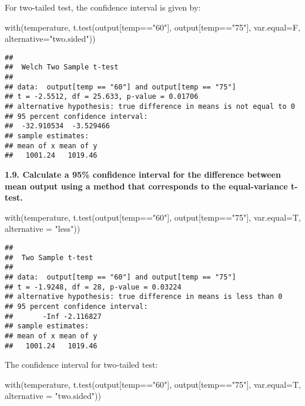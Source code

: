 \documentclass[
]{article}
\newenvironment{Shaded}{\begin{snugshade}}{\end{snugshade}}
\newcommand{\AttributeTok}[1]{\textcolor[rgb]{0.77,0.63,0.00}{#1}}
\newcommand{\FunctionTok}[1]{\textcolor[rgb]{0.00,0.00,0.00}{#1}}
\newcommand{\NormalTok}[1]{#1}
\newcommand{\SpecialCharTok}[1]{\textcolor[rgb]{0.00,0.00,0.00}{#1}}
\newcommand{\StringTok}[1]{\textcolor[rgb]{0.31,0.60,0.02}{#1}}
\begin{document}
For two-tailed test, the confidence interval is given by:

\begin{Shaded}
\begin{Highlighting}[]
\FunctionTok{with}\NormalTok{(temperature, }\FunctionTok{t.test}\NormalTok{(output[temp}\SpecialCharTok{==}\StringTok{"60"}\NormalTok{], output[temp}\SpecialCharTok{==}\StringTok{"75"}\NormalTok{], }\AttributeTok{var.equal=}\NormalTok{F, }\AttributeTok{alternative=}\StringTok{"two.sided"}\NormalTok{))}
\end{Highlighting}
\end{Shaded}

\begin{verbatim}
## 
##  Welch Two Sample t-test
## 
## data:  output[temp == "60"] and output[temp == "75"]
## t = -2.5512, df = 25.633, p-value = 0.01706
## alternative hypothesis: true difference in means is not equal to 0
## 95 percent confidence interval:
##  -32.910534  -3.529466
## sample estimates:
## mean of x mean of y 
##   1001.24   1019.46
\end{verbatim}

\textbf{1.9. Calculate a 95\% confidence interval for the difference
between mean output using a method that corresponds to the
equal-variance t-test.}

\begin{Shaded}
\begin{Highlighting}[]
\FunctionTok{with}\NormalTok{(temperature, }\FunctionTok{t.test}\NormalTok{(output[temp}\SpecialCharTok{==}\StringTok{"60"}\NormalTok{], output[temp}\SpecialCharTok{==}\StringTok{"75"}\NormalTok{], }\AttributeTok{var.equal=}\NormalTok{T, }\AttributeTok{alternative =} \StringTok{"less"}\NormalTok{))}
\end{Highlighting}
\end{Shaded}

\begin{verbatim}
## 
##  Two Sample t-test
## 
## data:  output[temp == "60"] and output[temp == "75"]
## t = -1.9248, df = 28, p-value = 0.03224
## alternative hypothesis: true difference in means is less than 0
## 95 percent confidence interval:
##       -Inf -2.116827
## sample estimates:
## mean of x mean of y 
##   1001.24   1019.46
\end{verbatim}

The confidence interval for two-tailed test:

\begin{Shaded}
\begin{Highlighting}[]
\FunctionTok{with}\NormalTok{(temperature, }\FunctionTok{t.test}\NormalTok{(output[temp}\SpecialCharTok{==}\StringTok{"60"}\NormalTok{], output[temp}\SpecialCharTok{==}\StringTok{"75"}\NormalTok{], }\AttributeTok{var.equal=}\NormalTok{T, }\AttributeTok{alternative =} \StringTok{"two.sided"}\NormalTok{))}
\end{Highlighting}
\end{Shaded}
\end{document}
